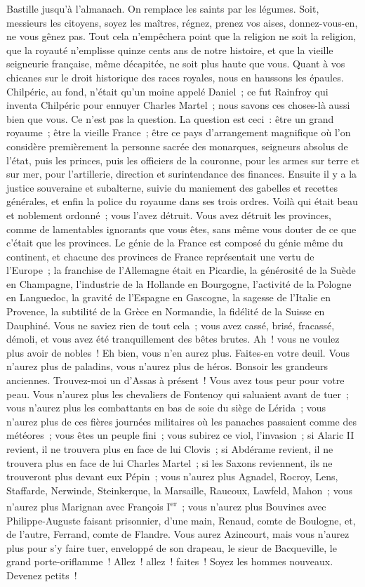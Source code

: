 \documentclass[french,twoside]{book} %
\begin{document}
Bastille jusqu’à l’almanach. On remplace les saints par les légumes. Soit, messieurs les citoyens, soyez les maîtres, régnez, prenez vos aises, donnez-vous-en, ne vous gênez pas. Tout cela n’empêchera point que la religion ne soit la religion, que la royauté n’emplisse quinze cents ans de notre histoire, et que la vieille seigneurie française, même décapitée, ne soit plus haute que vous. Quant à vos chicanes sur le droit historique des races royales, nous en haussons les épaules. Chilpéric, au fond, n’était qu’un moine appelé Daniel ; ce fut Rainfroy qui inventa Chilpéric pour ennuyer Charles Martel ; nous savons ces choses-là aussi bien que vous. Ce n’est pas la question. La question est ceci : être un grand royaume ; être la vieille France ; être ce pays d’arrangement magnifique où l’on considère premièrement la personne sacrée des monarques, seigneurs absolus de l’état, puis les princes, puis les officiers de la couronne, pour les armes sur terre et sur mer,  pour l’artillerie, direction et surintendance des finances. Ensuite il y a la justice souveraine et subalterne, suivie du maniement des gabelles et recettes générales, et enfin la police du royaume dans ses trois ordres. Voilà qui était beau et noblement ordonné ; vous l’avez détruit. Vous avez détruit les provinces, comme de lamentables ignorants que vous êtes, sans même vous douter de ce que c’était que les provinces. Le génie de la France est composé du génie même du continent, et chacune des provinces de France représentait une vertu de l’Europe ; la franchise de l’Allemagne était en Picardie, la générosité de la Suède en Champagne, l’industrie de la Hollande en Bourgogne, l’activité de la Pologne en Languedoc, la gravité de l’Espagne en Gascogne, la sagesse de l’Italie en Provence, la subtilité de la Grèce en Normandie, la fidélité de la Suisse en Dauphiné. Vous ne saviez rien de tout cela ; vous avez cassé, brisé, fracassé, démoli, et vous avez été tranquillement des bêtes brutes. Ah ! vous ne voulez plus avoir de nobles ! Eh bien, vous n’en aurez plus. Faites-en votre deuil. Vous n’aurez plus de paladins, vous n’aurez plus de héros. Bonsoir les grandeurs anciennes. Trouvez-moi un d’Assas à présent ! Vous avez tous peur pour votre peau. Vous n’aurez plus les chevaliers de Fontenoy qui saluaient avant de tuer ; vous n’aurez plus les combattants en bas de soie du siège de Lérida ; vous n’aurez plus de ces fières journées militaires où les panaches passaient comme des météores ; vous êtes un peuple fini ; vous subirez ce viol, l’invasion ; si Alaric II revient, il ne  trouvera plus en face de lui Clovis ; si Abdérame revient, il ne trouvera plus en face de lui Charles Martel ; si les Saxons reviennent, ils ne trouveront plus devant eux Pépin ; vous n’aurez plus Agnadel, Rocroy, Lens, Staffarde, Nerwinde, Steinkerque, la Marsaille, Raucoux, Lawfeld, Mahon ; vous n’aurez plus Marignan avec François I\textsuperscript{er} ; vous n’aurez plus Bouvines avec Philippe-Auguste faisant prisonnier, d’une main, Renaud, comte de Boulogne, et, de l’autre, Ferrand, comte de Flandre. Vous aurez Azincourt, mais vous n’aurez plus pour s’y faire tuer, enveloppé de son drapeau, le sieur de Bacqueville, le grand porte-oriflamme ! Allez ! allez ! faites ! Soyez les hommes nouveaux. Devenez petits !\par
\end{document}
